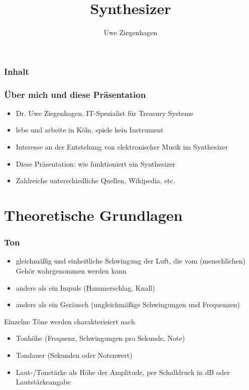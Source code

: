 \documentclass[11pt,ngerman]{beamer}
\author{Uwe Ziegenhagen}
\title{Synthesizer}
\begin{document}
 
 \begin{frame}

\maketitle
 
 \end{frame}
 
 
\begin{frame}
\frametitle{Inhalt}

\tableofcontents

\end{frame}
 
 \begin{frame}
 \frametitle{Über mich und diese Präsentation}
 
\begin{itemize}
 \item Dr. Uwe Ziegenhagen, IT-Spezialist für Treasury Systeme \item lebe und arbeite in Köln, spiele kein Instrument
 \item Interesse an der Entstehung von elektronischer Musik im Synthesizer
 \item Diese Präsentation: wie funktioniert ein Synthesizer 
 \item Zahlreiche unterschiedliche Quellen, Wikipedia, etc.
\end{itemize}
 \end{frame}
 
\section{Theoretische Grundlagen}


\begin{frame}
\frametitle{Ton}

\begin{itemize}
	\item gleichmäßig und einheitliche Schwingung der Luft, die vom (menschlichen) Gehör wahrgenommen werden kann
	\item anders als ein Impuls (Hammerschlag, Knall)
	\item anders als ein Geräusch (ungleichmäßige Schwingungen und Frequenzen)
\end{itemize}\vspace*{1em}

Einzelne Töne werden charakterisiert nach \vspace*{0.5em}

\begin{itemize}
	\item Tonhöhe (Frequenz, Schwingungen pro Sekunde, Note)
	\item Tondauer (Sekunden oder Notenwert)
	\item Laut-/Tonstärke als Höhe der Amplitude, per Schalldruck in dB oder Lautstärkeangabe
\end{itemize}

\end{frame}
\end{document}
